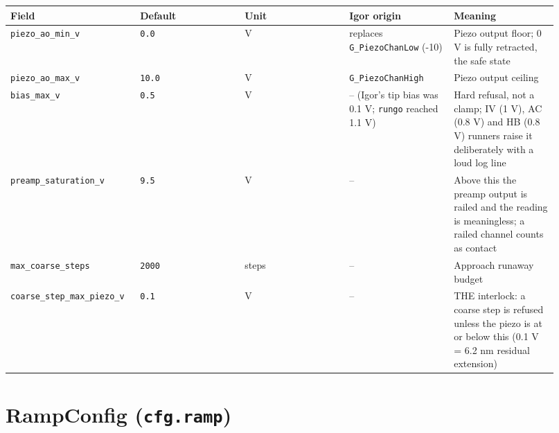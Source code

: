 \footnotesize\setlength{\LTleft}{0pt}\setlength{\LTright}{\fill}
\begin{longtable}{@{}>{\raggedright\arraybackslash}p{0.184\linewidth}>{\raggedright\arraybackslash}p{0.184\linewidth}>{\raggedright\arraybackslash}p{0.184\linewidth}>{\raggedright\arraybackslash}p{0.184\linewidth}>{\raggedright\arraybackslash}p{0.184\linewidth}@{}}
\toprule
\textbf{Field} & \textbf{Default} & \textbf{Unit} & \textbf{Igor origin} & \textbf{Meaning} \\
\midrule\endhead
\texttt{piezo\_\discretionary{}{}{}ao\_\discretionary{}{}{}min\_\discretionary{}{}{}v} & \texttt{0.\discretionary{}{}{}0} & V & replaces \texttt{G\_\discretionary{}{}{}Piezo\discretionary{}{}{}Chan\discretionary{}{}{}Low} (-10) & Piezo output floor; 0 V is fully retracted, the safe state \\
\texttt{piezo\_\discretionary{}{}{}ao\_\discretionary{}{}{}max\_\discretionary{}{}{}v} & \texttt{10.\discretionary{}{}{}0} & V & \texttt{G\_\discretionary{}{}{}Piezo\discretionary{}{}{}Chan\discretionary{}{}{}High} & Piezo output ceiling \\
\texttt{bias\_\discretionary{}{}{}max\_\discretionary{}{}{}v} & \texttt{0.\discretionary{}{}{}5} & V & -- (Igor's tip bias was 0.1 V; \texttt{rungo} reached 1.1 V) & Hard refusal, not a clamp; IV (1 V), AC (0.8 V) and HB (0.8 V) runners raise it deliberately with a loud log line \\
\texttt{preamp\_\discretionary{}{}{}saturation\_\discretionary{}{}{}v} & \texttt{9.\discretionary{}{}{}5} & V & -- & Above this the preamp output is railed and the reading is meaningless; a railed channel counts as contact \\
\texttt{max\_\discretionary{}{}{}coarse\_\discretionary{}{}{}steps} & \texttt{2000} & steps & -- & Approach runaway budget \\
\texttt{coarse\_\discretionary{}{}{}step\_\discretionary{}{}{}max\_\discretionary{}{}{}piezo\_\discretionary{}{}{}v} & \texttt{0.\discretionary{}{}{}1} & V & -- & THE interlock: a coarse step is refused unless the piezo is at or below this (0.1 V = 6.2 nm residual extension) \\
\bottomrule
\end{longtable}
\normalsize

\section{RampConfig (\texttt{cfg.\discretionary{}{}{}ramp})}

